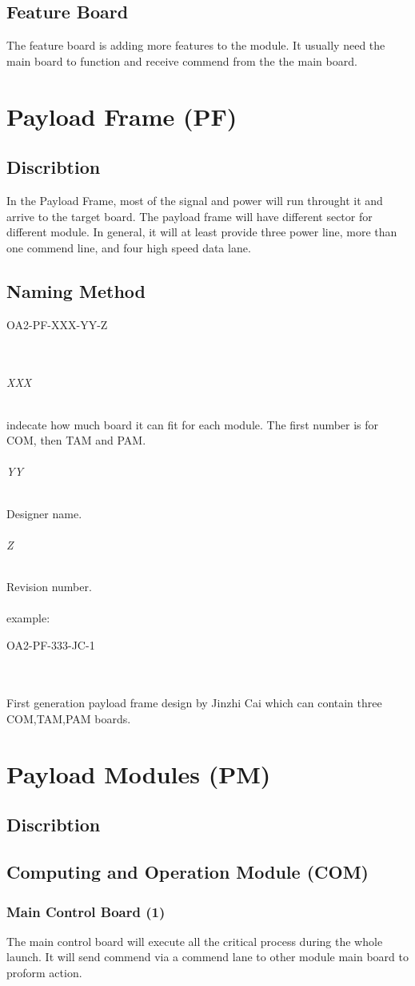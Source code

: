 \documentclass[12pt,article]{memoir}
\begin{document}
\section{Feature Board}%
The feature board is adding more features to the module. It usually need the main board to function and receive commend from the the main board.
\newpage
\chapter{Payload Frame (PF)}
\section{Discribtion}
In the Payload Frame, most of the signal and power will run throught it and arrive to the target board. The payload frame will have different sector for different module. In general, it will at least provide three power line, more than one commend line, and four high speed data lane.
\section{Naming Method}
\begin{LARGE}
OA2-PF-XXX-YY-Z
\end{LARGE}\\
\subparagraph{XXX}
indecate how much board it can fit for each module. The first number is for COM, then TAM and PAM.
\subparagraph{YY}
Designer name.
\subparagraph{Z}
Revision number.
\\\\
example: 
\begin{large}
OA2-PF-333-JC-1
\end{large}\\\\
First generation payload frame design by Jinzhi Cai which can contain three COM,TAM,PAM boards.
\newpage
\chapter{Payload Modules (PM)}
\section{Discribtion}
\section{Computing and Operation Module (COM)}
\subsection{Main Control Board (1)}
The main control board will execute all the critical process during the whole launch. It will send commend via a commend lane to other module main board to proform action.
\end{document}
